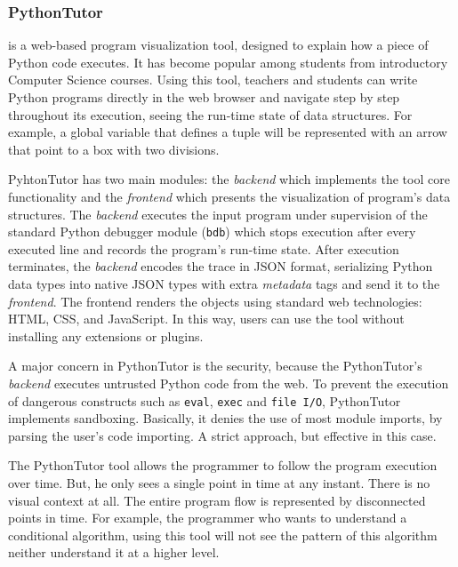 \subsubsection{PythonTutor~\cite{GuoSIGCSE2013}} is a web-based program visualization tool, designed to explain how a piece of Python code executes. It has become popular among students from introductory Computer Science courses. Using this tool, teachers and students can write Python programs directly in the web browser and navigate step by step throughout its execution, seeing the run-time state of data structures. For example, a global variable that defines a tuple will be represented with an arrow that point to a box with two divisions.

PyhtonTutor has two main modules: the \textit{backend} which implements the tool core functionality and the \textit{frontend} which presents the visualization of program's data structures. The \textit{backend} executes the input program under supervision of the standard Python debugger module (\texttt{bdb}) which stops execution after every executed line and records the program's run-time state. After execution terminates, the \textit{backend} encodes the trace in JSON format, serializing Python data types into native JSON types with extra \textit{metadata} tags and send it to the \textit{frontend}. The frontend renders the objects using standard web technologies: HTML, CSS, and JavaScript. In this way, users can use the tool without installing any extensions or plugins.

A major concern in PythonTutor is the security, because the PythonTutor's \textit{backend} executes untrusted Python code from the web. To prevent the execution of dangerous constructs such as {\tt eval}, {\tt exec} and {\tt file I/O}, PythonTutor implements sandboxing. Basically, it denies the use of most module imports, by parsing the user's code importing. A strict approach, but effective in this case.

The PythonTutor tool allows the programmer to follow the program execution over time. But, he only sees a single point in time at any instant. There is no visual context at all. The entire program flow is represented by disconnected points in time. For example, the programmer who wants to understand a conditional algorithm, using this tool will not see the pattern of this algorithm neither understand it at a higher level.
